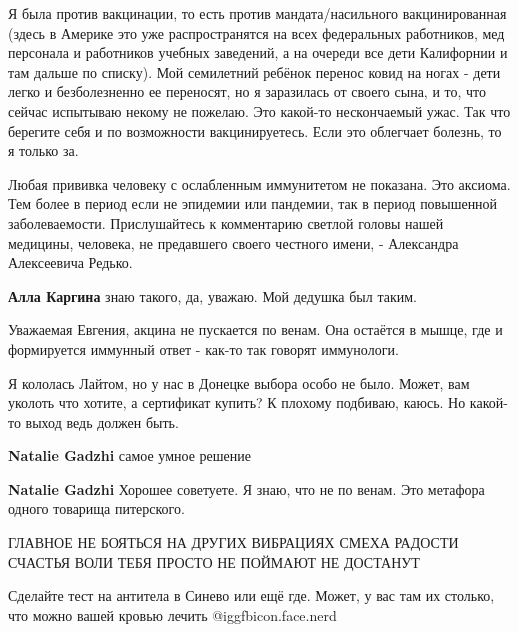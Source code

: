 \begin{itemize}
\begin{itemize}
\end{itemize} %


Я была против вакцинации, то есть против мандата/насильного вакцинированная
(здесь в Америке это уже распространятся на всех федеральных работников, мед
персонала и работников учебных заведений, а на очереди все дети Калифорнии и
там дальше по списку). Мой семилетний ребёнок перенос ковид на ногах - дети
легко и безболезненно ее переносят, но я заразилась от своего сына, и то, что
сейчас испытываю некому не пожелаю. Это какой-то нескончаемый ужас. Так что
берегите себя и по возможности вакцинируетесь. Если это облегчает болезнь, то я
только за.



Любая прививка человеку с ослабленным иммунитетом не показана. Это аксиома. Тем
более в период если не эпидемии или пандемии, так в период повышенной
заболеваемости. Прислушайтесь к комментарию светлой головы нашей медицины,
человека, не предавшего своего честного имени, - Александра Алексеевича Редько.

\begin{itemize} %
\textbf{Алла Каргина} знаю такого, да, уважаю. Мой дедушка был таким.
\end{itemize} %


Уважаемая Евгения, акцина не пускается по венам. Она остаётся в мышце, где и
формируется иммунный ответ - как-то так говорят иммунологи.

Я кололась Лайтом, но у нас в Донецке выбора особо не было. Может, вам уколоть
что хотите, а сертификат купить? К плохому подбиваю, каюсь. Но какой-то выход
ведь должен быть.

\begin{itemize} %
\textbf{Natalie Gadzhi} самое умное решение

\textbf{Natalie Gadzhi} Хорошее советуете. Я знаю, что не по венам. Это метафора одного товарища питерского.
\end{itemize} %

ГЛАВНОЕ НЕ БОЯТЬСЯ НА ДРУГИХ ВИБРАЦИЯХ СМЕХА РАДОСТИ СЧАСТЬЯ ВОЛИ ТЕБЯ ПРОСТО НЕ ПОЙМАЮТ НЕ ДОСТАНУТ

Сделайте тест на антитела в Синево или ещё где. Может, у вас там их столько, что можно вашей кровью лечить @igg{fbicon.face.nerd} 


\end{itemize}

